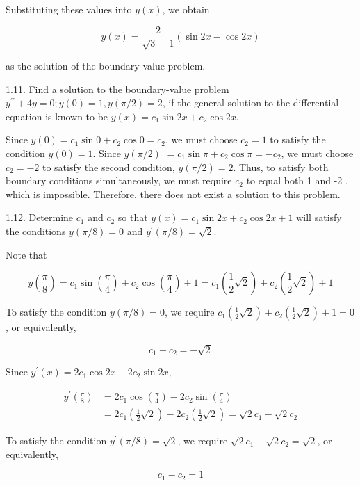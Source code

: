 \documentclass[10pt]{article}
\begin{document}
Substituting these values into $y(x)$, we obtain

$$
y(x)=\frac{2}{\sqrt{3}-1}(\sin 2 x-\cos 2 x)
$$

as the solution of the boundary-value problem.

1.11. Find a solution to the boundary-value problem $y^{\prime \prime}+4 y=0 ; y(0)=1, y(\pi / 2)=2$, if the general solution to the differential equation is known to be $y(x)=c_{1} \sin 2 x+c_{2} \cos 2 x$.

Since $y(0)=c_{1} \sin 0+c_{2} \cos 0=c_{2}$, we must choose $c_{2}=1$ to satisfy the condition $y(0)=1$. Since $y(\pi / 2)$ $=c_{1} \sin \pi+c_{2} \cos \pi=-c_{2}$, we must choose $c_{2}=-2$ to satisfy the second condition, $y(\pi / 2)=2$. Thus, to satisfy both boundary conditions simultaneously, we must require $c_{2}$ to equal both 1 and -2 , which is impossible. Therefore, there does not exist a solution to this problem.

1.12. Determine $c_{1}$ and $c_{2}$ so that $y(x)=c_{1} \sin 2 x+c_{2} \cos 2 x+1$ will satisfy the conditions $y(\pi / 8)=0$ and $y^{\prime}(\pi / 8)=\sqrt{2}$.

Note that

$$
y\left(\frac{\pi}{8}\right)=c_{1} \sin \left(\frac{\pi}{4}\right)+c_{2} \cos \left(\frac{\pi}{4}\right)+1=c_{1}\left(\frac{1}{2} \sqrt{2}\right)+c_{2}\left(\frac{1}{2} \sqrt{2}\right)+1
$$

To satisfy the condition $y(\pi / 8)=0$, we require $c_{1}\left(\frac{1}{2} \sqrt{2}\right)+c_{2}\left(\frac{1}{2} \sqrt{2}\right)+1=0$, or equivalently,


\begin{equation*}
c_{1}+c_{2}=-\sqrt{2} \tag{1}
\end{equation*}


Since $y^{\prime}(x)=2 c_{1} \cos 2 x-2 c_{2} \sin 2 x$,

$$
\begin{aligned}
y^{\prime}\left(\frac{\pi}{8}\right) & =2 c_{1} \cos \left(\frac{\pi}{4}\right)-2 c_{2} \sin \left(\frac{\pi}{4}\right) \\
& =2 c_{1}\left(\frac{1}{2} \sqrt{2}\right)-2 c_{2}\left(\frac{1}{2} \sqrt{2}\right)=\sqrt{2} c_{1}-\sqrt{2} c_{2}
\end{aligned}
$$

To satisfy the condition $y^{\prime}(\pi / 8)=\sqrt{2}$, we require $\sqrt{2} c_{1}-\sqrt{2} c_{2}=\sqrt{2}$, or equivalently,


\begin{equation*}
c_{1}-c_{2}=1 \tag{2}
\end{equation*}
\end{document}
